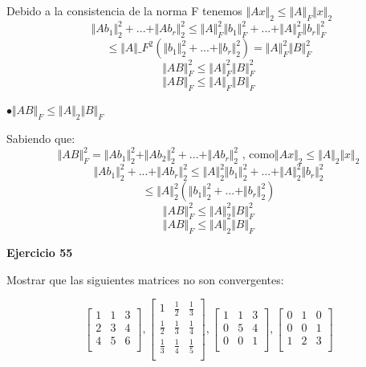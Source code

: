 \documentclass[12pt]{article}
\begin{document}
Debido a la consistencia de la norma F tenemos $\Vert Ax \Vert _2 \leq  \Vert A  \Vert_F \Vert x \Vert _2$
\[\Vert Ab_1\Vert_2^2 + ... + \Vert Ab_r\Vert_2^2 \leq \Vert A \Vert_F^2 \Vert b_1\Vert _F^2 + ... + \Vert A \Vert_F^2 \Vert b_r\Vert _F^2 \]
\[\leq \Vert A \Vert\_F^2 (\Vert b_1 \Vert_2^2 +... + \Vert b_r \Vert_2^2) = \Vert A \Vert_F^2 \Vert B \Vert_F^2\]
\[\Vert AB \Vert_F^2 \leq \Vert A \Vert_F^2 \Vert B \Vert_F^2 \]
\[\Vert AB \Vert_F \leq \Vert A \Vert_F \Vert B \Vert_F \]

$\bullet \Vert AB \Vert _F\leq\Vert A \Vert_2 \Vert B\Vert_F$

Sabiendo que:
\[\Vert AB\Vert_F ^2 =\Vert Ab_1\Vert_2^2 + \Vert Ab_2 \Vert_2^2 + ... + \Vert Ab_r\Vert_2^2 \textrm{ , como} \Vert Ax\Vert_2 \leq \Vert A \Vert_2 \Vert x \Vert_2  \] 
\[\Vert Ab_1 \Vert_2^2 + ... + \Vert Ab_r \Vert_2^2 \leq \Vert A \Vert_2^2 \Vert b_1\Vert_2^2 + ... + \Vert A \Vert_2^2 \Vert b_r\Vert_2^2\]
\[\leq \Vert A \Vert_2^2 (\Vert b_1 \Vert_2^2 + ... + \Vert b_r \Vert_2^2 )\]
\[\Vert AB \Vert _F^2\leq\Vert A \Vert_2^2 \Vert B\Vert_F^2\]
\[\Vert AB \Vert _F\leq\Vert A \Vert_2 \Vert B\Vert_F \]



\noindent \textbf{Ejercicio 55}

Mostrar que las siguientes matrices no son convergentes:

\[
\begin{bmatrix}
    1 & 1 & 3 \\
    2 & 3 & 4 \\
    4 & 5 & 6 \\
\end{bmatrix}
,
\begin{bmatrix}
    1 & \frac{1}{2} & \frac{1}{3} \\[4pt]
    \frac{1}{2} & \frac{1}{3} & \frac{1}{4} \\[4pt]
    \frac{1}{3} & \frac{1}{4} & \frac{1}{5} \\[4pt]
\end{bmatrix}
,
\begin{bmatrix}
    1 & 1 & 3 \\
    0 & 5 & 4 \\
    0 & 0 & 1 \\
\end{bmatrix}
,
\begin{bmatrix}
    0 & 1 & 0 \\
    0 & 0 & 1 \\
    1 & 2 & 3 \\
\end{bmatrix}
\]
\end{document}
